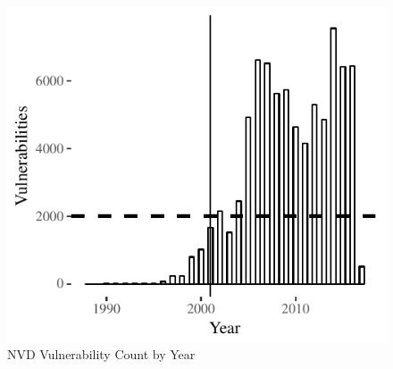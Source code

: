 \begin{figure}
	\centering
	\includegraphics[width=\columnwidth]{nvd_vulns_year}
	\caption{NVD Vulnerability Count by Year}
	\label{fig:nvd_vulns_year}
\end{figure}
